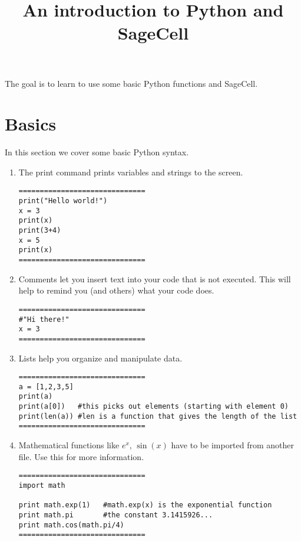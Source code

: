 \documentclass{ximera}
\title{An introduction to Python and SageCell}
\begin{document}
The goal is to learn to use some basic Python functions and SageCell.
\begin{abstract}  
\end{abstract}  
\maketitle

\section{Basics}

In this section we cover some basic Python syntax.

    \begin{enumerate}
        \item The print command prints variables and strings to the screen.
\begin{verbatim}
==============================
print("Hello world!")
x = 3
print(x)
print(3+4)
x = 5
print(x)
==============================
\end{verbatim}

	\item Comments let you insert text into your code that is not executed. This will help to remind you (and others) what your code does.
\begin{verbatim}
==============================
#"Hi there!"
x = 3
==============================
\end{verbatim}
	\item Lists help you organize and manipulate data.
\begin{verbatim}
==============================
a = [1,2,3,5]
print(a)
print(a[0])   #this picks out elements (starting with element 0)
print(len(a)) #len is a function that gives the length of the list
==============================
\end{verbatim}
	\item Mathematical functions like $e^x$, $\sin(x)$ have to be imported from another file. Use this  for more information.
\begin{verbatim}
==============================
import math

print math.exp(1)   #math.exp(x) is the exponential function
print math.pi       #the constant 3.1415926...
print math.cos(math.pi/4)
==============================
\end{verbatim}
    \end{enumerate}
\end{document}
